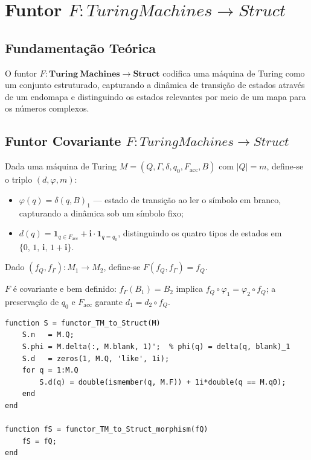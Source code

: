\section{Funtor \texorpdfstring{$F: Turing Machines \to Struct$}{F: Turing Machines -> Struct}}
\label{sec:functor-turing-struct}

\subsection{Fundamentação Teórica}

O funtor $F: \mathbf{Turing\ Machines} \to \mathbf{Struct}$ codifica uma máquina de Turing como um conjunto estruturado, capturando a dinâmica de transição de estados através de um endomapa e distinguindo os estados relevantes por meio de um mapa para os números complexos.

\subsection{Funtor Covariante \texorpdfstring{$F: Turing Machines \to Struct$}{F: Turing Machines -> Struct}}

\begin{definition}
Dada uma máquina de Turing $M = (Q, \Gamma, \delta, q_0, F_{\mathrm{acc}}, B)$ com $|Q| = m$, define-se o triplo $(d, \varphi, m)$:
\begin{itemize}
    \item $\varphi(q) = \delta(q, B)_1$ --- estado de transição ao ler o símbolo em branco, capturando a dinâmica sob um símbolo fixo;
    \item $d(q) = \mathbf{1}_{q \in F_{\mathrm{acc}}} + \mathbf{i} \cdot \mathbf{1}_{q = q_0}$, distinguindo os quatro tipos de estados em $\{0,\,1,\,\mathbf{i},\,1{+}\mathbf{i}\}$.
\end{itemize}
Dado $(f_Q, f_\Gamma): M_1 \to M_2$, define-se $F(f_Q, f_\Gamma) = f_Q$.
\end{definition}

\begin{proposition}
$F$ é covariante e bem definido: $f_\Gamma(B_1) = B_2$ implica $f_Q \circ \varphi_1 = \varphi_2 \circ f_Q$; a preservação de $q_0$ e $F_{\mathrm{acc}}$ garante $d_1 = d_2 \circ f_Q$.
\end{proposition}

\begin{lstlisting}[style=matlab, caption={Funtor covariante $F: \mathbf{Turing\ Machines} \to \mathbf{Struct}$}]
function S = functor_TM_to_Struct(M)
    S.n   = M.Q;
    S.phi = M.delta(:, M.blank, 1)';  % phi(q) = delta(q, blank)_1
    S.d   = zeros(1, M.Q, 'like', 1i);
    for q = 1:M.Q
        S.d(q) = double(ismember(q, M.F)) + 1i*double(q == M.q0);
    end
end

function fS = functor_TM_to_Struct_morphism(fQ)
    fS = fQ;
end
\end{lstlisting}

